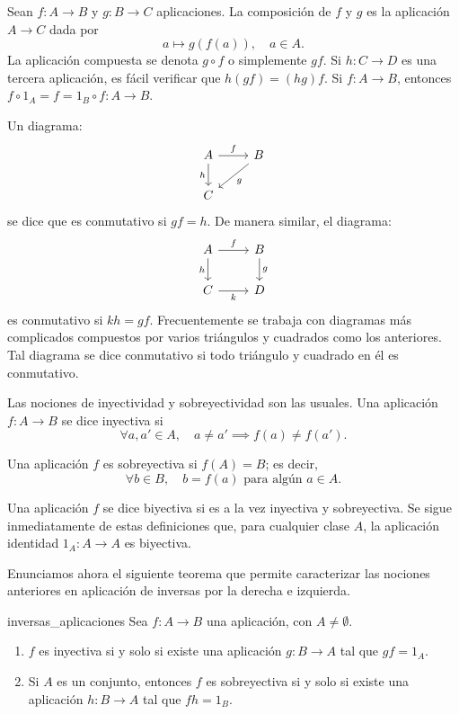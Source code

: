 Sean \( f: A \to B \) y \( g: B \to C \) aplicaciones. La {composición} de \( f \) y \( g \) es la aplicación \( A \to C \) dada por
\[
a \mapsto g(f(a)), \quad a \in A.
\]
La aplicación compuesta se denota \( g \circ f \) o simplemente \( gf \). Si \( h: C \to D \) es una tercera aplicación, es fácil verificar que \( h(gf) = (hg)f \). Si \( f: A \to B \), entonces \( f \circ 1_A = f = 1_B \circ f: A \to B \).

Un diagrama:
\[
    \begin{tikzcd}
    A \arrow{r}{f} \arrow[swap]{d}{h} & B \arrow{dl}{g} \\
    C
  \end{tikzcd}
\]
se dice que es conmutativo si \( gf = h \). De manera similar, el diagrama:
\[
\begin{tikzcd}
    A \arrow{r}{f} \arrow[swap]{d}{h} & B \arrow{d}{g} \\
    C \arrow[swap]{r}{k} & D 
  \end{tikzcd}
\]
es conmutativo si \( kh = gf \). Frecuentemente se trabaja con diagramas más complicados compuestos por varios triángulos y cuadrados como los anteriores. Tal diagrama se dice conmutativo si todo triángulo y cuadrado en él es conmutativo.

Las nociones de inyectividad y sobreyectividad son las usuales. Una aplicación \( f: A \to B \) se dice inyectiva si
\[
\forall a, a' \in A, \quad a \neq a' \implies f(a) \neq f(a').
\]

Una aplicación \( f \) es sobreyectiva si \( f(A) = B \); es decir,
\[
\forall b \in B, \quad b = f(a) \text{ para algún } a \in A.
\]

Una aplicación \( f \) se dice biyectiva si es a la vez inyectiva y sobreyectiva. Se sigue inmediatamente de estas definiciones que, para cualquier clase \( A \), la aplicación identidad \( 1_A: A \to A \) es biyectiva.

Enunciamos ahora el siguiente teorema que permite caracterizar las nociones anteriores en aplicación de inversas por la derecha e izquierda.

\begin{theorem}{}{inversas_aplicaciones}
    Sea \( f: A \to B \) una aplicación, con \( A \neq \emptyset \).
    \begin{enumerate}
        \item \( f \) es inyectiva si y solo si existe una aplicación \( g: B \to A \) tal que \( gf = 1_A \).

        \item Si \( A \) es un conjunto, entonces \( f \) es sobreyectiva si y solo si existe una aplicación \( h: B \to A \) tal que \( fh = 1_B \).
    \end{enumerate}
\end{theorem}


